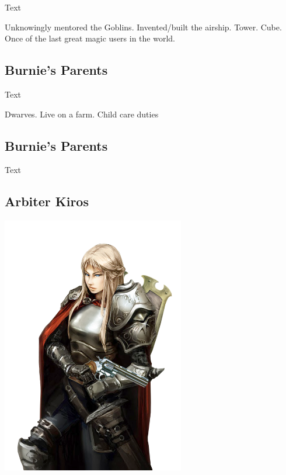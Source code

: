 \noindent 

Text

Unknowingly mentored the Goblins.  Invented/built the airship.  Tower.  Cube.  Once of the last great magic users in the world.  

\smallskip

\subsection*{Burnie's Parents} 

\noindent 

Text

Dwarves.  Live on a farm.  Child care duties

\smallskip

\subsection*{Burnie's Parents} 

\noindent 

Text

\smallskip

\subsection*{Arbiter Kiros} 

\begin{center}
\includegraphics[width=80mm]{./content/img/kiros.png}
\begin{figure}[h]
\end{figure}
\end{center}

